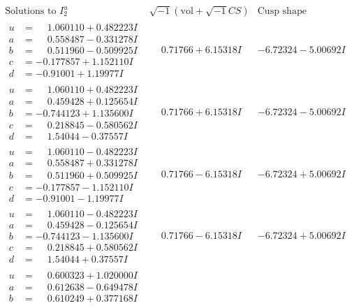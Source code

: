 \documentclass[1p]{elsarticle_modified}
\theoremstyle{definition}
\newcommand{\I}{\sqrt{-1}}
\begin{document}
$$\begin{array}{c|c|c}
\text{Solutions to }I^u_{2}& \I (\text{vol} + \sqrt{-1}CS) & \text{Cusp shape}\\
 \hline 
\begin{aligned}
u &= \phantom{-}1.060110 + 0.482223 I \\
a &= \phantom{-}0.558487 - 0.331278 I \\
b &= \phantom{-}0.511960 - 0.509925 I \\
c &= -0.177857 + 1.152110 I \\
d &= -0.91001 + 1.19977 I\end{aligned}
 & \phantom{-}0.71766 + 6.15318 I & -6.72324 - 5.00692 I \\ \hline\begin{aligned}
u &= \phantom{-}1.060110 + 0.482223 I \\
a &= \phantom{-}0.459428 + 0.125654 I \\
b &= -0.744123 + 1.135600 I \\
c &= \phantom{-}0.218845 - 0.580562 I \\
d &= \phantom{-}1.54044 - 0.37557 I\end{aligned}
 & \phantom{-}0.71766 + 6.15318 I & -6.72324 - 5.00692 I \\ \hline\begin{aligned}
u &= \phantom{-}1.060110 - 0.482223 I \\
a &= \phantom{-}0.558487 + 0.331278 I \\
b &= \phantom{-}0.511960 + 0.509925 I \\
c &= -0.177857 - 1.152110 I \\
d &= -0.91001 - 1.19977 I\end{aligned}
 & \phantom{-}0.71766 - 6.15318 I & -6.72324 + 5.00692 I \\ \hline\begin{aligned}
u &= \phantom{-}1.060110 - 0.482223 I \\
a &= \phantom{-}0.459428 - 0.125654 I \\
b &= -0.744123 - 1.135600 I \\
c &= \phantom{-}0.218845 + 0.580562 I \\
d &= \phantom{-}1.54044 + 0.37557 I\end{aligned}
 & \phantom{-}0.71766 - 6.15318 I & -6.72324 + 5.00692 I \\ \hline\begin{aligned}
u &= \phantom{-}0.600323 + 1.020000 I \\
a &= \phantom{-}0.612638 - 0.649478 I \\
b &= \phantom{-}0.610249 + 0.377168 I \\

\end{aligned}
\end{array}$$
\end{document}
